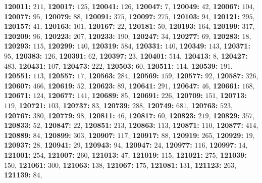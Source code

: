 \textsf{\bfseries 120011:} $211$, \textsf{\bfseries 120017:} $125$, \textsf{\bfseries 120041:} $126$, \textsf{\bfseries 120047:} $7$, \textsf{\bfseries 120049:} $42$, \textsf{\bfseries 120067:} $104$, \textsf{\bfseries 120077:} $95$, \textsf{\bfseries 120079:} $88$, \textsf{\bfseries 120091:} $375$, \textsf{\bfseries 120097:} $275$, \textsf{\bfseries 120103:} $94$, \textsf{\bfseries 120121:} $295$, \textsf{\bfseries 120157:} $41$, \textsf{\bfseries 120163:} $101$, \textsf{\bfseries 120167:} $22$, \textsf{\bfseries 120181:} $50$, \textsf{\bfseries 120193:} $164$, \textsf{\bfseries 120199:} $317$, \textsf{\bfseries 120209:} $96$, \textsf{\bfseries 120223:} $207$, \textsf{\bfseries 120233:} $190$, \textsf{\bfseries 120247:} $34$, \textsf{\bfseries 120277:} $69$, \textsf{\bfseries 120283:} $18$, \textsf{\bfseries 120293:} $115$, \textsf{\bfseries 120299:} $140$, \textsf{\bfseries 120319:} $584$, \textsf{\bfseries 120331:} $140$, \textsf{\bfseries 120349:} $143$, \textsf{\bfseries 120371:} $95$, \textsf{\bfseries 120383:} $126$, \textsf{\bfseries 120391:} $62$, \textsf{\bfseries 120397:} $23$, \textsf{\bfseries 120401:} $514$, \textsf{\bfseries 120413:} $8$, \textsf{\bfseries 120427:} $483$, \textsf{\bfseries 120431:} $107$, \textsf{\bfseries 120473:} $222$, \textsf{\bfseries 120503:} $60$, \textsf{\bfseries 120511:} $114$, \textsf{\bfseries 120539:} $191$, \textsf{\bfseries 120551:} $113$, \textsf{\bfseries 120557:} $17$, \textsf{\bfseries 120563:} $284$, \textsf{\bfseries 120569:} $159$, \textsf{\bfseries 120577:} $92$, \textsf{\bfseries 120587:} $326$, \textsf{\bfseries 120607:} $466$, \textsf{\bfseries 120619:} $52$, \textsf{\bfseries 120623:} $89$, \textsf{\bfseries 120641:} $291$, \textsf{\bfseries 120647:} $46$, \textsf{\bfseries 120661:} $168$, \textsf{\bfseries 120671:} $124$, \textsf{\bfseries 120677:} $141$, \textsf{\bfseries 120689:} $85$, \textsf{\bfseries 120691:} $226$, \textsf{\bfseries 120709:} $151$, \textsf{\bfseries 120713:} $119$, \textsf{\bfseries 120721:} $103$, \textsf{\bfseries 120737:} $83$, \textsf{\bfseries 120739:} $288$, \textsf{\bfseries 120749:} $681$, \textsf{\bfseries 120763:} $523$, \textsf{\bfseries 120767:} $380$, \textsf{\bfseries 120779:} $98$, \textsf{\bfseries 120811:} $46$, \textsf{\bfseries 120817:} $60$, \textsf{\bfseries 120823:} $219$, \textsf{\bfseries 120829:} $357$, \textsf{\bfseries 120833:} $52$, \textsf{\bfseries 120847:} $22$, \textsf{\bfseries 120851:} $213$, \textsf{\bfseries 120863:} $113$, \textsf{\bfseries 120871:} $110$, \textsf{\bfseries 120877:} $414$, \textsf{\bfseries 120889:} $84$, \textsf{\bfseries 120899:} $303$, \textsf{\bfseries 120907:} $117$, \textsf{\bfseries 120917:} $88$, \textsf{\bfseries 120919:} $265$, \textsf{\bfseries 120929:} $19$, \textsf{\bfseries 120937:} $28$, \textsf{\bfseries 120941:} $29$, \textsf{\bfseries 120943:} $94$, \textsf{\bfseries 120947:} $24$, \textsf{\bfseries 120977:} $116$, \textsf{\bfseries 120997:} $14$, \textsf{\bfseries 121001:} $254$, \textsf{\bfseries 121007:} $260$, \textsf{\bfseries 121013:} $47$, \textsf{\bfseries 121019:} $115$, \textsf{\bfseries 121021:} $275$, \textsf{\bfseries 121039:} $150$, \textsf{\bfseries 121061:} $300$, \textsf{\bfseries 121063:} $138$, \textsf{\bfseries 121067:} $175$, \textsf{\bfseries 121081:} $131$, \textsf{\bfseries 121123:} $263$, \textsf{\bfseries 121139:} $84$, 

